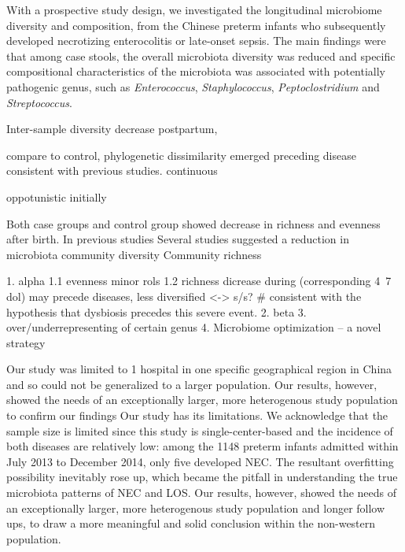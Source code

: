 \documentclass[fleqn,10pt]{wlpeerj} %
\begin{document}
With a prospective study design, we investigated the longitudinal microbiome diversity and composition, from the Chinese preterm infants who subsequently developed necrotizing enterocolitis or late-onset sepsis. The main findings were that among case stools, the overall microbiota diversity was reduced and specific compositional characteristics of the microbiota was associated with potentially pathogenic genus, such as \textit{Enterococcus}, \textit{Staphylococcus}, \textit{Peptoclostridium} and \textit{Streptococcus}.

Inter-sample diversity decrease postpartum,

compare to control, phylogenetic dissimilarity emerged preceding disease
consistent with previous studies. continuous

oppotunistic
initially


\noindent
Both case groups and control group showed decrease in richness and evenness after birth. In previous studies Several studies suggested a reduction in microbiota community diversity Community richness

1. alpha  1.1 evenness minor rols 1.2 richness dicrease during  (corresponding 4~7 dol) may precede diseases, less diversified <-> s/s? \# consistent with the hypothesis that dysbiosis precedes this severe event.
2. beta
3. over/underrepresenting of certain genus
4. Microbiome optimization -- a novel strategy


\noindent
Our study was limited to 1 hospital in one specific geographical region in China and so could not be generalized to a larger population. Our results, however, showed the needs of an exceptionally larger, more heterogenous study population to confirm our findings
Our study has its limitations. We acknowledge that the sample size is limited since this study is single-center-based and the incidence of both diseases are relatively low: among the 1148 preterm infants admitted within July 2013 to December 2014, only five developed NEC. The resultant overfitting possibility inevitably rose up, which became the pitfall in understanding the true microbiota patterns of NEC and LOS. Our results, however, showed the needs of an exceptionally larger, more heterogenous study population and longer follow ups, to draw a more meaningful and solid conclusion within the non-western population.
\end{document}
